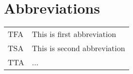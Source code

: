 \chapter*{Abbreviations}

\begin{table}[ht]
\setlength{\extrarowheight}{.4em}
\begin{tabular}{ll}

TFA & This is first abbreviation \\
TSA  & This is second abbreviation \\
TTA & ... \\


\end{tabular}
\end{table}